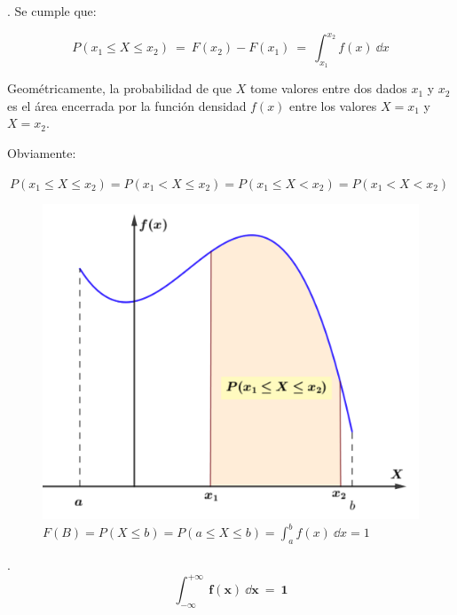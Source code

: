 \begin{theorem}
.	Se cumple que:

$$ P(x_1\le X \le x_2) \ = \ F(x_2)-F(x_1) \ = \ \displaystyle \int_{x_1}^{x_2} f(x)\ \dd x$$

\vspace{2mm} Geométricamente, la probabilidad de que $X$ tome valores entre dos dados $x_1$ y $x_2$ es el área encerrada por la función densidad $f(x)$ entre los valores $X=x_1$ y $X=x_2$.

\vspace{2mm} Obviamente: 

\vspace{2mm} $\  P(x_1\le X \le x_2)=P(x_1 < X \le x_2)=P(x_1\le X < x_2)=P(x_1 < X  < x_2)$	
\end{theorem}

	\begin{figure}[H]
	\centering
	\includegraphics[width=.5\textwidth]{imagenes/imagenes04/T04IM10.png}
	\caption*{\small{$\displaystyle F(B)=P(X\le b)=P(a\le X \le b)=\int_a^b f(x)\ \dd x=1 $}}
	\end{figure}
	
\begin{theorem}
.	$$ \boldsymbol{ \displaystyle \int_{-\infty}^{+\infty} \ f(x) \ \dd x \ = \ 1 } $$	
\end{theorem}


